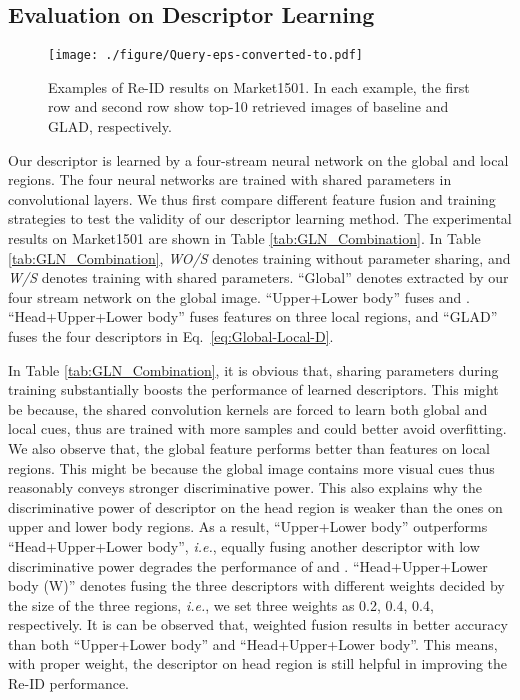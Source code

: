 \documentclass[sigconf]{acmart}
\begin{document}
\subsection{ Evaluation on Descriptor Learning}
\label{sec:GLD_B}
 
\begin{figure}
\begin{center}
\texttt{[image: ./figure/Query-eps-converted-to.pdf]}
\end{center}
\caption{Examples of Re-ID results on Market1501. In each example, the first row and second row show top-10 retrieved images of baseline and GLAD, respectively.}
\label{fig:Query}
\end{figure}


Our descriptor is learned by a four-stream neural network on the global and local regions. The four neural networks are trained with shared parameters in convolutional layers. We thus first compare different feature fusion and training strategies to test the validity of our descriptor learning method. The experimental results on Market1501 are shown in Table \ref{tab:GLN_Combination}. In Table \ref{tab:GLN_Combination}, \emph{WO/S} denotes training without parameter sharing, and \emph{W/S} denotes training with shared parameters. ``Global'' denotes  extracted by our four stream network on the global image. ``Upper+Lower body'' fuses  and . ``Head+Upper+Lower body'' fuses features on three local regions, and ``GLAD'' fuses the four descriptors in Eq.~\eqref{eq:Global-Local-D}.

In Table \ref{tab:GLN_Combination}, it is obvious that, sharing parameters during training substantially boosts the performance of learned descriptors. This might be because, the shared convolution kernels are forced to learn both global and local cues, thus are trained with more samples and could better avoid overfitting. We also observe that, the global feature performs better than features on local regions. This might be because the global image contains more visual cues thus reasonably conveys stronger discriminative power. This also explains why the discriminative power of descriptor on the head region is weaker than the ones on upper and lower body regions. As a result, ``Upper+Lower body'' outperforms ``Head+Upper+Lower body'',\emph{ i.e.}, equally fusing another descriptor with low discriminative power degrades the performance of  and .  ``Head+Upper+Lower body (W)'' denotes fusing the three descriptors with different weights decided by the size of the three regions, \emph{ i.e.}, we set three weights as 0.2, 0.4, 0.4, respectively. It is can be observed that, weighted fusion results in better accuracy than both ``Upper+Lower body'' and ``Head+Upper+Lower body''. This means, with proper weight, the descriptor on head region is still helpful in improving the Re-ID performance.
\end{document}
